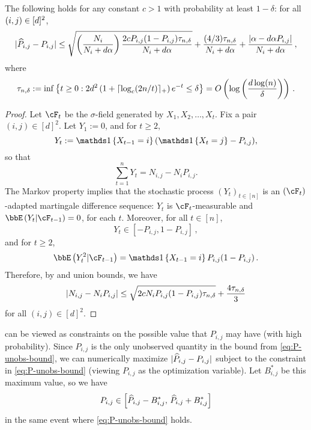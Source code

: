 \begin{lemma}
  \label{lem:P-unobs-bound}
  The following holds for any constant $c>1$ with probability at least
  $1-\delta$: for all $(i,j) \in [d]^2$,
  \begin{equation}
    | \widehat{P}_{i,j} - P_{i,j} |
    \leq
    \sqrt{\left(\frac{N_i}{N_i+d\alpha}\right)\frac{2cP_{i,j}(1-P_{i,j})\tau_{n,\delta}}{N_i+d\alpha}}
    + \frac{(4/3)\tau_{n,\delta}}{N_i+d\alpha}
    + \frac{|\alpha-d\alpha P_{i,j}|}{N_i+d\alpha}\,,
    \label{eq:P-unobs-bound}
  \end{equation}
  where
  \begin{equation}
    \tau_{n,\delta}
    := \inf
    \left\{
      t\geq0 :
      2d^2 \left( 1 + \lceil\log_c(2n/t)\rceil_+ \right) e^{-t} \leq \delta
    \right\}
    = O\left( \log\left( \frac{d\log(n)}{\delta} \right) \right)
    \,.
    \label{eq:emptail}
  \end{equation}
\end{lemma}
\begin{proof}
  Let $\cF_t$ be the $\sigma$-field generated by $X_1,X_2,\dotsc,X_t$.
  Fix a pair $(i,j) \in [d]^2$.
  Let $Y_1 := 0$, and for $t \geq 2$,
  \[
    Y_t := \Ind{X_{t-1} = i} (\Ind{X_t=j} - P_{i,j})
    ,
  \]
  so that
  \[
    \sum_{t=1}^n Y_t
    = N_{i,j} - N_i P_{i,j}
    .
  \]
  The Markov property implies that the stochastic process
  $(Y_t)_{t\in[n]}$ is an $(\cF_t)$-adapted martingale difference
  sequence: $Y_t$ is $\cF_t$-measurable and $\EE{Y_t| \cF_{t-1} } =
  0$, for each $t$.
  Moreover, for all $t \in [n]$,
  \[
    Y_t \in [-P_{i,j},1-P_{i,j}]
    \,,
  \]
  and for $t \geq 2$,
  \[
    \EE{Y_t^2| \cF_{t-1} } = \Ind{X_{t-1}=i} P_{i,j} (1-P_{i,j})
    \,.
  \]
  Therefore, by  and union bounds, we have
  \[
    | N_{i,j} - N_i P_{i,j} |
    \leq \sqrt{2c N_i P_{i,j} (1-P_{i,j}) \tau_{n,\delta}} +
    \frac{4\tau_{n,\delta}}3
  \]
  for all $(i,j) \in [d]^2$.
\end{proof}

 can be viewed as constraints on the possible
value that $P_{i,j}$ may have (with high probability).
Since $P_{i,j}$ is the only unobserved quantity in the bound from
\cref{eq:P-unobs-bound}, we can numerically maximize $|\widehat{P}_{i,j} -
P_{i,j}|$ subject to the constraint in \cref{eq:P-unobs-bound}
(viewing $P_{i,j}$ as the optimization variable).
Let $B_{i,j}^*$ be this maximum value, so we have
\[
  P_{i,j} \in
  \left[
    \widehat{P}_{i,j} - B_{i,j}^*,\,
    \widehat{P}_{i,j} + B_{i,j}^*
  \right]
\]
in the same event where \cref{eq:P-unobs-bound} holds.

